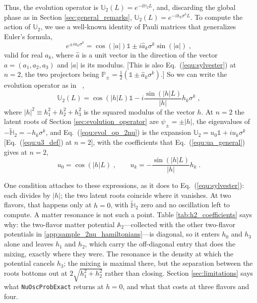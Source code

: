 \documentclass[final,5p,times,twocolumn,sort,compress]{elsarticle}
\newcommand{\eq}{Eq.}
\providecommand{\Ref}{}
\newcommand{\equ}[1]{\eq~(\ref{equ:#1})}
\begin{document}
Thus, the evolution operator is $\mathbb{U}_2\left(L\right) = e^{-i \mathbb{H}_2 L}$, and, discarding the global phase as in Section \ref{sec:general_remarks}, $\mathbb{U}_2\left(L\right) = e^{-ih_k\sigma^kL}$.  To compute the action of $\mathbb{U}_2$, we use a well-known identity of Pauli matrices that generalizes Euler's formula, 
\begin{equation}
 \label{equ:pauli_identity}
 e^{\pm i a_k \sigma^k}
 =
 \cos\left(\left\vert a \right\vert \right) \mathbb{1}
 \pm
 i \hat{a}_k\sigma^k\sin\left(\left\vert a\right\vert \right) \;,
\end{equation}
valid for real $a_k$, where $\hat{a}$ is a unit vector in the direction of the vector $a = (a_1, a_2, a_3)$ and $\lvert a \rvert$ is its modulus.  [This is also \equ{sylvester} at $n = 2$, the two projectors being $\mathbb{P}_\pm = \frac{1}{2}\left(\mathbb{1} \pm \hat{a}_k \sigma^k\right)$.]  So we can write the evolution operator as in \Ref\ \cite{Ohlsson:1999xb},
\begin{equation}
 \label{equ:evol_op_2nu}
 \mathbb{U}_2\left(L\right)
 =
 \cos\left(\left\vert h\right\vert L\right) \mathbb{1}
 -
 i \frac{\sin\left(\left\vert h\right\vert L\right)}{\lvert h \rvert} h_k\sigma^k  \;,
\end{equation}
where $\lvert h \rvert^2 \equiv h_1^2 + h_2^2 + h_3^2$ is the squared modulus of the vector $h$.  At $n = 2$ the latent roots of Section \ref{sec:evolution_operator} are $\psi_\pm = \pm \lvert h \rvert$, the eigenvalues of $-\tilde{\mathbb{H}}_2 = -h_k \sigma^k$, and \equ{evol_op_2nu} is the expansion $\mathbb{U}_2 = u_0 \mathbb{1} + i u_k \sigma^k$ [\equ{u3_def} at $n = 2$], with the coefficients that \equ{ua_general} gives at $n = 2$,
\begin{equation}
 u_0 = \cos\left(\lvert h \rvert L\right) \;, \qquad
 u_k = -\frac{\sin\left(\lvert h \rvert L\right)}{\lvert h \rvert} h_k \;.
\end{equation}

One condition attaches to these expressions, as it does to \equ{sylvester}: each divides by $\lvert h \rvert$; the two latent roots coincide where it vanishes.  At two flavors, that happens only at $h = 0$, with $\tilde{\mathbb{H}}_2$ zero and no oscillation left to compute.  A matter resonance is not such a point.  Table \ref{tab:h2_coefficients} says why: the two-flavor matter potential $\mathbb{A}_2$---collected with the other two-flavor potentials in \ref{app:sample_2nu_hamiltonians}---is diagonal, so it enters $h_0$ and $h_3$ alone and leaves $h_1$ and $h_2$, which carry the off-diagonal entry that does the mixing, exactly where they were.  The resonance is the density at which the potential cancels $h_3$; the mixing is maximal there, but the separation between the roots bottoms out at $2\sqrt{h_1^2 + h_2^2}$ rather than closing.  Section \ref{sec:limitations} says what {\tt NuOscProbExact} returns at $h = 0$, and what that costs at three flavors and four.
\end{document}
